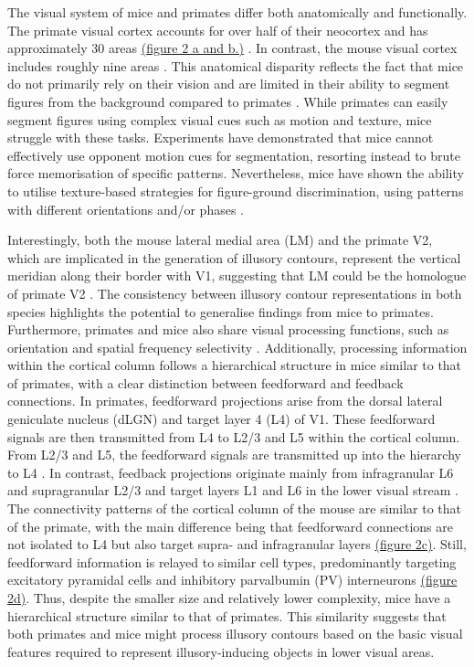 \documentclass[12pt]{article}
\begin{document}
\bigbreak
The visual system of mice and primates differ both anatomically and functionally. The primate visual cortex accounts for over half of their neocortex and has approximately 30 areas \hyperref[fig:Laminar_Figure]{(figure 2 a and b.)} \autocite{fellemanDistributedHierarchicalProcessing1991}. In contrast, the mouse visual cortex includes roughly nine areas \autocite{wangAreaMapMouse2007}. This anatomical disparity reflects the fact that mice do not primarily rely on their vision and are limited in their ability to segment figures from the background compared to primates \autocite{luongoMicePrimatesUse2023}. While primates can easily segment figures using complex visual cues such as motion and texture, mice struggle with these tasks. Experiments have demonstrated that mice cannot effectively use opponent motion cues for segmentation, resorting instead to brute force memorisation of specific patterns. Nevertheless, mice have shown the ability to utilise texture-based strategies for figure-ground discrimination, using patterns with different orientations and/or phases \autocite{kirchbergerEssentialRoleFeedback2020}. 

Interestingly, both the mouse lateral medial area (LM) and the primate V2, which are implicated in the generation of illusory contours, represent the vertical meridian along their border with V1, suggesting that LM could be the homologue of primate V2 \autocite{gamanutAnatomicalFunctionalConnectomes2022}. The consistency between illusory contour representations in both species highlights the potential to generalise findings from mice to primates. Furthermore, primates and mice also share visual processing functions, such as orientation and spatial frequency selectivity \autocite{niellHighlySelectiveReceptive2008}. Additionally, processing information within the cortical column follows a hierarchical structure in mice similar to that of primates, with a clear distinction between feedforward and feedback connections. In primates, feedforward projections arise from the dorsal lateral geniculate nucleus (dLGN) and target layer 4 (L4) of V1. These feedforward signals are then transmitted from L4 to L2/3 and L5 within the cortical column. From L2/3 and L5, the feedforward signals are transmitted up into the hierarchy to L4 \autocite{markovAnatomyHierarchyFeedforward2014}. In contrast, feedback projections originate mainly from infragranular L6 and supragranular L2/3 and target layers L1 and L6 in the lower visual stream \autocite{rocklandWhatWeKnow2019}. The connectivity patterns of the cortical column of the mouse are similar to that of the primate, with the main difference being that feedforward connections are not isolated to L4 but also target supra- and infragranular layers \hyperref[fig:Laminar_Figure]{(figure 2c)}. Still, feedforward information is relayed to similar cell types, predominantly targeting excitatory pyramidal cells and inhibitory parvalbumin (PV) interneurons \hyperref[fig:Laminar_Figure]{(figure 2d)}. Thus, despite the smaller size and relatively lower complexity, mice have a hierarchical structure similar to that of primates. This similarity suggests that both primates and mice might process illusory contours based on the basic visual features required to represent illusory-inducing objects in lower visual areas. 
\end{document}
